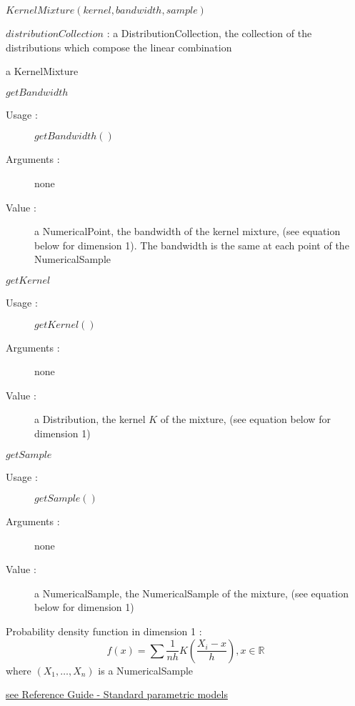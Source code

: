 \begin{description}

\item[Usage :] $KernelMixture(kernel, bandwidth, sample)$

\item[Arguments :] $distributionCollection$     : a DistributionCollection, the collection of the  distributions which compose the linear combination


\item[Value :] a  KernelMixture

\item[Some methods :]  \rule{0pt}{1em}
  \begin{description}
  \item $getBandwidth$
    \begin{description}
    \item[Usage :] $getBandwidth()$
    \item[Arguments :] none
    \item[Value :] a NumericalPoint, the bandwidth of the kernel mixture, (see equation below for dimension 1). The bandwidth is the same at each point of the NumericalSample
    \end{description}
    \bigskip

  \item $getKernel$
    \begin{description}
    \item[Usage :] $getKernel()$
    \item[Arguments :] none
    \item[Value :] a Distribution, the kernel $K$ of the mixture, (see equation below for dimension 1)
    \end{description}
    \bigskip

  \item $getSample$
    \begin{description}
    \item[Usage :] $getSample()$
    \item[Arguments :] none
    \item[Value :] a NumericalSample, the NumericalSample of the mixture, (see equation below for dimension 1)
    \end{description}


  \end{description}

\item[Details :]  \rule{0pt}{1em}
  \begin{description}
  \item Probability density function in dimension 1 :
    $$
    f(x) =  \sum \frac{1}{nh}K(\frac{X_i-x}{h}), x \in \mathbb{R}
    $$
    where $(X_1, \dots, X_n)$ is  a NumericalSample
  \end{description}

\item[Links :]  \rule{0pt}{1em}
  \href{OpenTURNS_ReferenceGuide.pdf}{see Reference Guide - Standard parametric models}
\end{description}

